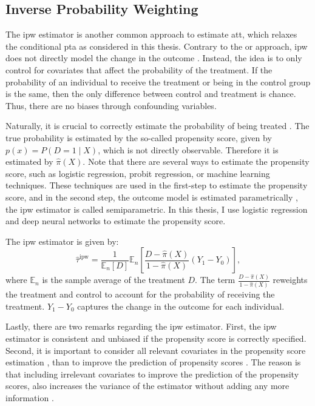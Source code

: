 \subsection{Inverse Probability Weighting}
The \ac{ipw} estimator is another common approach to estimate \ac{att}, which relaxes the conditional \ac{pta} as considered in this thesis.
Contrary to the \ac{or} approach, \ac{ipw} does not directly model the change in the outcome \citep{santannaDoublyRobustDifferenceindifferences2020}.
Instead, the idea is to only control for covariates that affect the probability of the treatment.
If the probability of an individual to receive the treatment or being in the control group is the same, then the only difference between control and treatment is chance.
Thus, there are no biases through confounding variables.

Naturally, it is crucial to correctly estimate the probability of being treated \citep{angrist2009mostly}.
The true probability is estimated by the so-called propensity score, given by $p(x) = P(D=1 \mid X)$, which is not directly observable.
Therefore it is estimated by $\hat{\pi}(X)$.
Note that there are several ways to estimate the propensity score, such as logistic regression, probit regression, or machine learning techniques.
These techniques are used in the first-step to estimate the propensity score, and in the second step, the outcome model is estimated parametrically \citep{abadieSemiparametricDifferenceinDifferencesEstimators2005}, the \ac{ipw} estimator is called semiparametric.
In this thesis, I use logistic regression and deep neural networks to estimate the propensity score.

The \ac{ipw} estimator is given by:
\begin{equation}
\hat{\tau}^{\text{ipw}} = \frac{1}{\mathbb{E}_n[D]} \mathbb{E}_n \left[ \frac{D - \hat{\pi}(X)}{1 - \hat{\pi}(X)} (Y_1 - Y_0) \right],
\label{eq:4}
\end{equation}
where $\mathbb{E}_n$  is the sample average of the treatment $D$.
The term $\frac{D - \hat{\pi}(X)}{1 - \hat{\pi}(X)}$ reweights the treatment and control to account for the probability of receiving the treatment.
$Y_1 - Y_0$ captures the change in the outcome for each individual.


Lastly, there are two remarks regarding the \ac{ipw} estimator.
First, the \ac{ipw} estimator is consistent and unbiased if the propensity score is correctly specified.
Second, it is important to consider all relevant covariates in the propensity score estimation \citep{angrist2009mostly}, than to improve the prediction of propensity scores \citep{https://doi.org/10.3982/ECTA18515}.
The reason is that including irrelevant covariates to improve the prediction of the propensity scores, also increases the variance of the estimator without adding any more information \citep{hernanCausalInferenceWhat}.

